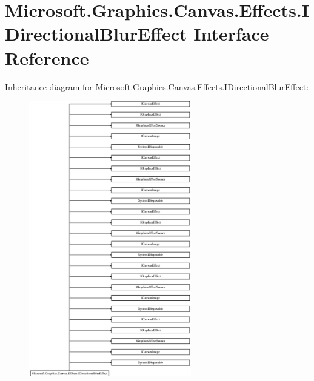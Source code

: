 \hypertarget{interface_microsoft_1_1_graphics_1_1_canvas_1_1_effects_1_1_i_directional_blur_effect}{}\section{Microsoft.\+Graphics.\+Canvas.\+Effects.\+I\+Directional\+Blur\+Effect Interface Reference}
\label{interface_microsoft_1_1_graphics_1_1_canvas_1_1_effects_1_1_i_directional_blur_effect}
Inheritance diagram for Microsoft.\+Graphics.\+Canvas.\+Effects.\+I\+Directional\+Blur\+Effect\+:\begin{figure}[H]
\begin{center}
\leavevmode
\includegraphics[height=12.000000cm]{interface_microsoft_1_1_graphics_1_1_canvas_1_1_effects_1_1_i_directional_blur_effect}
\end{center}
\end{figure}

